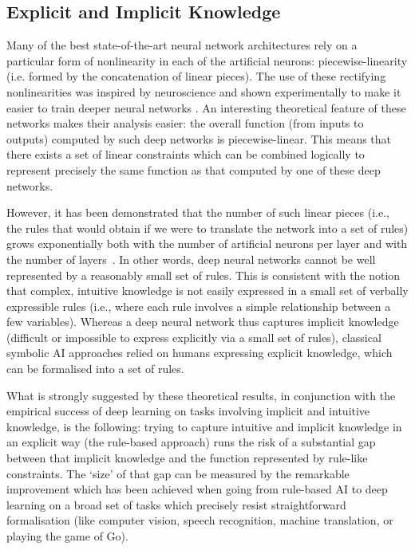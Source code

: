 \documentclass{amsart}
\theoremstyle{indented}
\theoremstyle{indentedProp}
\theoremstyle{indented}
\theoremstyle{indented}
\theoremstyle{indented}
\theoremstyle{indented}
\theoremstyle{indented}
\begin{document}
\subsection{Explicit and Implicit Knowledge}
\label{sec:Assumption3}

Many of the best state-of-the-art neural network architectures rely on a particular form of nonlinearity in each of the artificial neurons: piecewise-linearity (i.e. formed by the concatenation of linear pieces). The use of these rectifying nonlinearities was inspired by neuroscience and shown experimentally to make it easier to train deeper neural networks \citep{Glorot+al-AI-2011-small}. An interesting theoretical feature of these networks makes their analysis easier: the overall function (from inputs to outputs) computed by such deep networks is piecewise-linear. This means that there exists a set of linear constraints which can be combined logically to represent precisely the same function as that computed by one of these deep networks.

However, it has been demonstrated that the number of such linear pieces (i.e., the rules that would obtain if we were to translate the network into a set of rules) grows exponentially both with the number of artificial neurons per layer and with the number of layers~\citep{Montufar-et-al-NIPS2014}. In other words, deep neural networks cannot be well represented by a reasonably small set of rules. This is consistent with the notion that complex, intuitive knowledge is not easily expressed in a small set of verbally expressible rules (i.e., where each rule involves a simple relationship between a few variables). Whereas a deep neural network thus captures implicit knowledge (difficult or impossible to express explicitly via a small set of rules), classical symbolic AI approaches relied on humans expressing explicit knowledge, which can be formalised into a set of rules.







What is strongly suggested by these theoretical results, in conjunction with the empirical success of deep learning on tasks involving implicit and intuitive knowledge, is the following: trying to capture intuitive and implicit knowledge in an explicit way (the rule-based approach) runs the risk of a substantial gap between that implicit knowledge and the function represented by rule-like constraints. The `size' of that gap can be measured by the remarkable improvement which has been achieved when going from rule-based AI to deep learning on a broad set of tasks which precisely resist straightforward formalisation (like computer vision, speech recognition, machine translation, or playing the game of Go).
\end{document}
